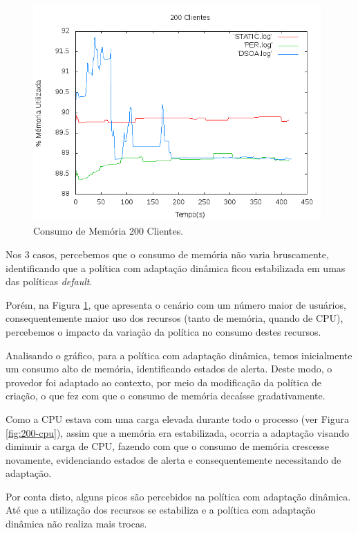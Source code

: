 \begin{figure}[htp]
\centering
\includegraphics[width=11cm]{chapters/chapter4/mem-200.png}
\caption[Consumo de Memória 200 Clientes]{Consumo de Memória 200 Clientes.}
\label{fig:200-cl}
\end{figure}

Nos 3 casos, percebemos que o consumo de memória não varia bruscamente, identificando que a política com adaptação dinâmica ficou estabilizada em umas das políticas \textit{default}.

Porém, na Figura \ref{fig:200-cl}, que apresenta o cenário com um número maior de usuários, consequentemente maior uso dos recursos (tanto de memória, quando de CPU), percebemos o impacto da variação da política no consumo destes recursos.

Analisando o gráfico, para a política com adaptação dinâmica, temos inicialmente um consumo alto de memória, identificando estados de alerta. Deste modo, o provedor foi adaptado ao contexto, por meio da modificação da política de criação, o que fez com que o consumo de memória decaísse gradativamente.

Como a CPU estava com uma carga elevada durante todo o processo (ver Figura \ref{fig:200-cpu}), assim que a memória era estabilizada, ocorria a adaptação visando diminuir a carga de CPU, fazendo com que o consumo de memória crescesse novamente, evidenciando estados de alerta e consequentemente necessitando de adaptação. 

Por conta disto, alguns picos são percebidos na política com adaptação dinâmica. Até que a utilização dos recursos se estabiliza e a política com adaptação dinâmica não realiza mais trocas.


